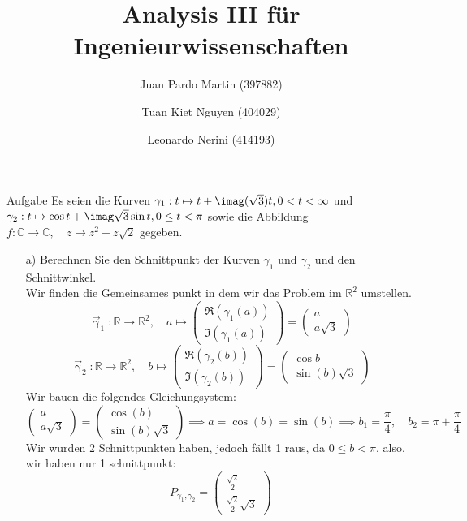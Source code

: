 \documentclass{scrartcl}
\title{Analysis III für Ingenieurwissenschaften}
\author{Juan Pardo Martin (397882)\and Tuan Kiet Nguyen (404029)\and Leonardo Nerini (414193)}
\def\mbb#1{\mathbb{#1}}
\def\bC{\mbb{C}}
\def\bR{\mbb{R}}
\newcommand{\func}[3]{#1\colon#2\to#3}
\newcommand{\vfunc}[5]{\func{#1}{#2}{#3},\quad#4\longmapsto#5}
\begin{document}
\maketitle
\begin{section}{Aufgabe}%
Es seien die Kurven \(\gamma_1 : t \mapsto t + \imag(\sqrt 3)t, 0 < t < \infty\) 
und 
\(\gamma_2 : t \mapsto \cos t + \imag\sqrt 3 \sin t, 0 \leq t < \pi\)
sowie die Abbildung \(\vfunc{f}{\bC}{\bC}{z}{z^2-z\sqrt 2}\)
 gegeben.
\begin{itemize}
\item[a)]
Berechnen Sie den Schnittpunkt der Kurven $\gamma_1$ und $\gamma_2$ und den Schnittwinkel.\\
Wir finden die Gemeinsames punkt in dem wir das Problem im $\bR^2$ umstellen.
\[\vfunc{\vec{\upgamma}_1}{\bR}{\bR^2}{a}{\begin{pmatrix}\Re(\gamma_1(a))\\\Im(\gamma_1(a))\end{pmatrix}
=\begin{pmatrix}a\\a\sqrt{3}\end{pmatrix}}\]
\[\vfunc{\vec{\upgamma}_2}{\bR}{\bR^2}{b}{\begin{pmatrix}\Re(\gamma_2(b))\\\Im(\gamma_2(b))\end{pmatrix}
=\begin{pmatrix}\cos b\\\sin(b)\sqrt{3}\end{pmatrix}}\]
Wir bauen die folgendes Gleichungsystem:
\[\begin{pmatrix}a\\a\sqrt{3}\end{pmatrix}=\begin{pmatrix}\cos(b)\\\sin(b)\sqrt{3}\end{pmatrix}
\implies a=\cos(b)=\sin(b)\implies b_1=\frac{\pi}{4},\quad b_2=\pi+\frac{\pi}{4}\]
Wir wurden 2 Schnittpunkten haben, jedoch fällt 1 raus, da $0 \leq b < \pi$, also, wir haben nur 1 schnittpunkt:
\newcommand{\schnt}[3]{#3_{#1,#2}}
\[\schnt{\gamma_1}{\gamma_2}{P}=\begin{pmatrix}\frac{\sqrt{2}}{2}\\\frac{\sqrt{2}}{2} \sqrt{3}\end{pmatrix}%
\]
\end{itemize}
\end{section}
\end{document}

